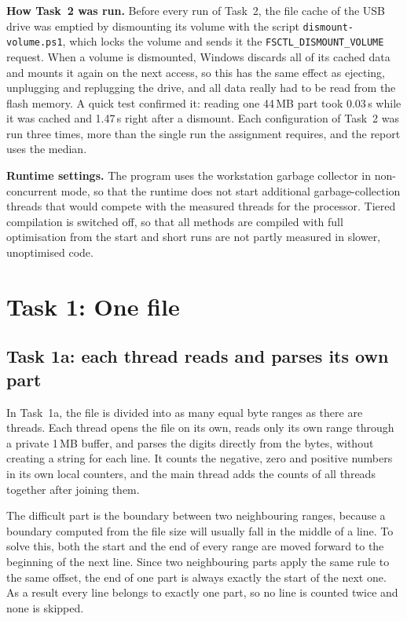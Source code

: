 \documentclass[11pt,a4paper]{article}
\begin{document}
\textbf{How Task~2 was run.} Before every run of Task~2, the file cache of the USB drive was emptied by
dismounting its volume with the script \texttt{dismount-volume.ps1}, which locks the volume and sends
it the \texttt{FSCTL\_DISMOUNT\_VOLUME} request. When a volume is dismounted, Windows discards all of its
cached data and mounts it again on the next access, so this has the same effect as ejecting,
unplugging and replugging the drive, and all data really had to be read from the flash memory. A
quick test confirmed it: reading one 44\,MB part took 0.03\,s while it was cached and 1.47\,s right
after a dismount. Each configuration of Task~2 was run three times, more than the single run the
assignment requires, and the report uses the median.

\textbf{Runtime settings.} The program uses the workstation garbage collector in non-concurrent mode,
so that the runtime does not start additional garbage-collection threads that would compete with
the measured threads for the processor. Tiered compilation is switched off, so that all methods are
compiled with full optimisation from the start and short runs are not partly measured in slower,
unoptimised code.

\section{Task 1: One file}

\subsection{Task 1a: each thread reads and parses its own part}

In Task~1a, the file is divided into as many equal byte ranges as there are threads. Each thread
opens the file on its own, reads only its own range through a private 1\,MB buffer, and parses the
digits directly from the bytes, without creating a string for each line. It counts the negative,
zero and positive numbers in its own local counters, and the main thread adds the counts of all
threads together after joining them.

The difficult part is the boundary between two neighbouring ranges, because a boundary computed from
the file size will usually fall in the middle of a line. To solve this, both the start and the end
of every range are moved forward to the beginning of the next line. Since two neighbouring parts
apply the same rule to the same offset, the end of one part is always exactly the start of the next
one. As a result every line belongs to exactly one part, so no line is counted twice and none is
skipped.
\end{document}
